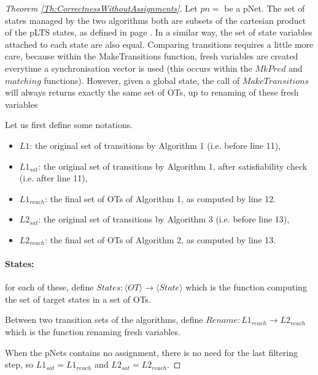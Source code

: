 \documentclass[smallcondensed]{svjour3}
\newcommand{\noteInEM}[2][inline,color=green!40]{\todo[#1]{{\bf Eric: } {#2}}}
\begin{document}
\begin{proof}[Theorem \ref{Th:CorrectnessWithoutAssignments}]

 Let $pn=$ be a pNet. The set of states 
 managed by the two algorithms both are subsets of the cartesian
 product of the pLTS states, as defined in page \pageref{def-states}. In a
 similar way, the set of state variables attached to each state are
 also equal. Comparing  
 transitions requires a little more care, because within the
 MakeTransitions function, fresh variables are created everytime a
 synchronisation vector is used (this occurs within the $MkPred$ and
 $matching$ functions). However, given a global state, the call of
 $MakeTransitions$ will always returns exactly the same set of OTs, up to
renaming of these fresh variables

  Let us first define some notations.
 \begin{itemize}
    \item $L1$: the original set of transitions by Algorithm 1
      (i.e. before line 11), 
    \item $L1_{sat}$:  the original set of transitions by Algorithm 1, after
      satisfiability check (i.e. after line 11),
    \item $L1_{reach}$: the final set of OTs of Algorithm 1, as computed
      by line 12.
    \item $L2_{sat}$: the original set of transitions by Algorithm 3
      (i.e. before line 13), 
    \item $L2_{reach}$: the final set of OTs of Algorithm 2, as computed
          by line 13.
\end{itemize}

\paragraph{States:} for each of these, define $States: \langle OT\rangle\rightarrow\langle State\rangle$ which is the function computing the set of target states in a
set of OTs. 

Between two transition sets of the algorithms, define
$Rename:  L1_{reach} \rightarrow L2_{reach}$ which is the function
renaming fresh variables. 

When the pNets contains no assignment, there is no need for the last
filtering step, so $L1_{sat}=L1_{reach}$ and $L2_{sat}=L2_{reach}$. 



\end{proof}
\end{document}
